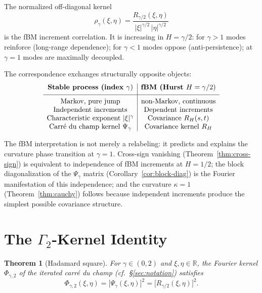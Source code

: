 \documentclass[11pt,a4paper]{article}
\theoremstyle{plain}
\newtheorem{theorem}{Theorem}[section]
\theoremstyle{definition}
\theoremstyle{remark}
\newcommand{\R}{\mathbb{R}}
\begin{document}
The normalized off-diagonal kernel
\[
  \rho_\gamma(\xi,\eta)
  = \frac{R_{\gamma/2}(\xi,\eta)}
    {|\xi|^{\gamma/2}\,|\eta|^{\gamma/2}}
\]
is the fBM increment correlation. It is increasing in $H = \gamma/2$:
for $\gamma > 1$ modes reinforce (long-range dependence);
for $\gamma < 1$ modes oppose (anti-persistence);
at $\gamma = 1$ modes are maximally decoupled.

The correspondence exchanges structurally opposite objects:
\[
\begin{array}{c|c}
\textbf{Stable process (index } \gamma\text{)}
& \textbf{fBM (Hurst } H = \gamma/2\text{)} \\[4pt]
\hline
\rule{0pt}{12pt}
\text{Markov, pure jump} & \text{non-Markov, continuous} \\
\text{Independent increments} & \text{Dependent increments} \\
\text{Characteristic exponent } |\xi|^\gamma &
  \text{Covariance } R_H(s,t) \\
\text{Carr\'e du champ kernel } \Psi_\gamma &
  \text{Covariance kernel } R_H
\end{array}
\]

The fBM interpretation is not merely a relabeling: it predicts and
explains the curvature phase transition at $\gamma = 1$.
Cross-sign vanishing (Theorem~\ref{thm:cross-sign}) is equivalent
to independence of fBM increments at $H = 1/2$; the block
diagonalization of the $\Psi_\gamma$ matrix
(Corollary~\ref{cor:block-diag}) is the Fourier manifestation
of this independence; and the curvature $\kappa = 1$
(Theorem~\ref{thm:cauchy}) follows because independent increments
produce the simplest possible covariance structure.


\section{The $\Gamma_2$-Kernel Identity}\label{sec:gamma2}

\begin{theorem}[Hadamard square]\label{thm:gamma2-kernel}
For $\gamma \in (0,2)$ and $\xi,\eta \in \R$, the Fourier kernel
$\Phi_{\gamma,2}$ of the iterated carr\'e du champ
(cf.~\S\ref{sec:notation}) satisfies
\begin{equation}\label{eq:Phi-formula}
  \Phi_{\gamma,2}(\xi,\eta) = \bigl[\Psi_\gamma(\xi,\eta)\bigr]^2
  = \bigl[R_{\gamma/2}(\xi,\eta)\bigr]^2.
\end{equation}
\end{theorem}
\end{document}
